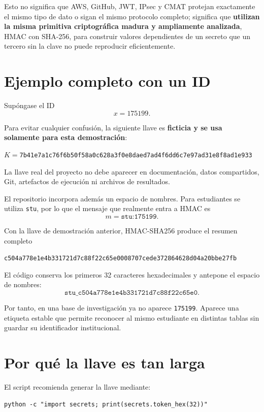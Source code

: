 \documentclass[11pt,a4paper]{article}
\begin{document}
Esto no significa que AWS, GitHub, JWT, IPsec y CMAT protejan exactamente el mismo tipo de dato o sigan el mismo protocolo completo; significa que \textbf{utilizan la misma primitiva criptográfica madura y ampliamente analizada}, HMAC con SHA-256, para construir valores dependientes de un secreto que un tercero sin la clave no puede reproducir eficientemente.

\section{Ejemplo completo con un ID}

Supóngase el ID
\[
x=175199.
\]

Para evitar cualquier confusión, la siguiente llave es \textbf{ficticia y se usa solamente para esta demostración}:
\begin{center}
\small $K={}$\nolinkurl{7b41e7a1c76f6b50f58a0c628a3f0e8daed7ad4f6dd6c7e97ad31e8f8ad1e933}
\end{center}

La llave real del proyecto no debe aparecer en documentación, datos compartidos, Git, artefactos de ejecución ni archivos de resultados.

El repositorio incorpora además un espacio de nombres. Para estudiantes se utiliza \texttt{stu}, por lo que el mensaje que realmente entra a HMAC es
\[
m=\texttt{stu:175199}.
\]

Con la llave de demostración anterior, HMAC-SHA256 produce el resumen completo
\begin{center}
\small\nolinkurl{c504a778e1e4b331721d7c88f22c65e0008707cede372864628d04a20bbe27fb}
\end{center}

El código conserva los primeros 32 caracteres hexadecimales y antepone el espacio de nombres:
\[
\boxed{\texttt{stu\_c504a778e1e4b331721d7c88f22c65e0}}.
\]

Por tanto, en una base de investigación ya no aparece \texttt{175199}. Aparece una etiqueta estable que permite reconocer al mismo estudiante en distintas tablas sin guardar su identificador institucional.

\section{Por qué la llave es tan larga}

El script recomienda generar la llave mediante:

\begin{lstlisting}
python -c "import secrets; print(secrets.token_hex(32))"
\end{lstlisting}
\end{document}
